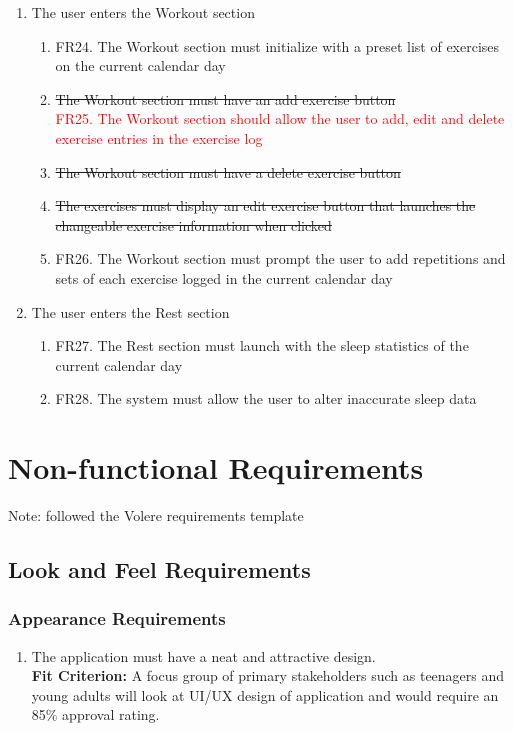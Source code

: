 \documentclass[12pt,letterpaper]{article}
\begin{document}
\begin{enumerate}[{BE}1.]
	\item The user enters the Workout section
	\begin{enumerate}[resume*]
		\item  FR24. The Workout section must initialize with a preset list of exercises on the current calendar day
\item {\color{red}\sout{The Workout section must have an add exercise button}}\\
\textcolor{red}{FR25. The Workout section should allow the user to add, edit and delete exercise entries in the exercise log}
\item {\color{red}\sout{The Workout section must have a delete exercise button}}
\item {\color{red}\sout{The exercises must display an edit exercise button that launches the changeable exercise information when clicked}}
		\item  FR26. The Workout section must prompt the user to add repetitions and sets of each exercise logged in the current calendar day
	\end{enumerate}
	
	\item The user enters the Rest section
	\begin{enumerate}[resume*]
		\item  FR27. The Rest section must launch with the sleep statistics of the current calendar day
		\item  FR28. The system must allow the user to alter inaccurate sleep data
	\end{enumerate}
\end{enumerate}

\section{Non-functional Requirements}
\noindent Note: followed the Volere requirements template

\subsection{Look and Feel Requirements}
\subsubsection{Appearance Requirements}
\begin{enumerate}[{LF}1.] 
	\item The application must have a neat and attractive design.\\
	{\textbf{Fit Criterion:} A focus group of primary stakeholders such as teenagers and young adults will look at UI/UX design of application and would require an 85\% approval rating.}
\end{enumerate}
\end{document}
